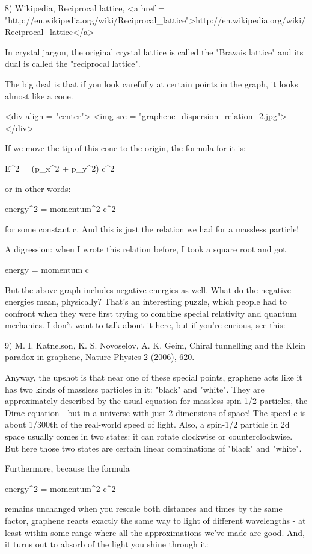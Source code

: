 8) Wikipedia, Reciprocal lattice, 
<a href = "http://en.wikipedia.org/wiki/Reciprocal_lattice">http://en.wikipedia.org/wiki/Reciprocal_lattice</a>

In crystal jargon, the original crystal lattice is called the "Bravais
lattice" and its dual is called the "reciprocal lattice".

The big deal is that if you look carefully at certain points in the
graph, it looks almost like a cone.  

<div align = "center">
<img src = "graphene_dispersion_relation_2.jpg">
</div>

If we move the tip of this cone
to the origin, the formula for it is:

E^{2} = (p_{x}^{2} + 
p_{y}^{2}) c^{2} 

or in other words:

energy^{2} = momentum^{2} c^{2}

for some constant c.  And this is just the relation we had for a
massless particle!

A digression: when I wrote this relation before, I took a square root 
and got 

energy = momentum c


But the above graph includes negative 
energies as well.  What do the negative energies mean, physically?
That's an interesting puzzle, which people had to confront when they
were first trying to combine special relativity and quantum mechanics.
I don't want to talk about it here, but if you're curious, see this:

9) M. I. Katnelson, K. S. Novoselov, A. K. Geim, Chiral tunnelling and
the Klein paradox in graphene, Nature Physics 2 (2006), 620.

Anyway, the upshot is that near one of these special points, graphene
acts like it has two kinds of massless particles in it:
"black" and "white".  They are approximately
described by the usual equation for massless spin-1/2 particles, the
Dirac equation - but in a universe with just 2 dimensions of space!
The speed c is about 1/300th of the real-world speed of light.  Also,
a spin-1/2 particle in 2d space usually comes in two states: it can
rotate clockwise or counterclockwise.  But here those two states are
certain linear combinations of "black" and "white".

Furthermore, because the formula 

energy^{2} = momentum^{2} c^{2}

remains unchanged when you rescale both distances and times by the
same factor, graphene reacts exactly the same way to light of 
different wavelengths - at least within some range where all the
approximations we've made are good.  And, it turns out to absorb
\pi \alpha  of the light you shine through it:


